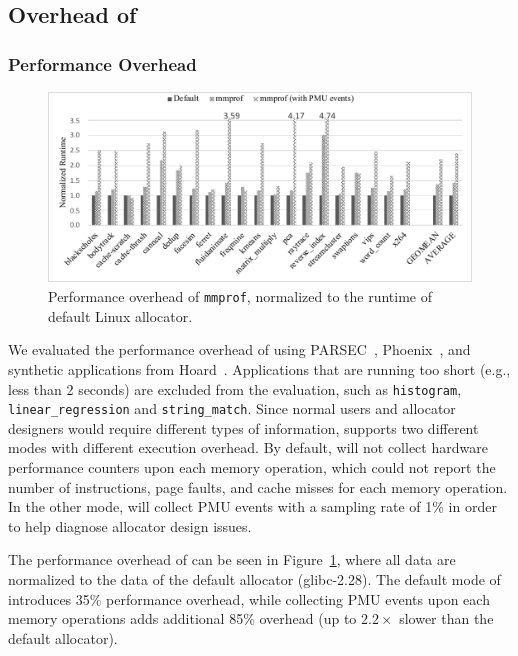 


\subsection{Overhead of \MP{}}

\subsubsection{Performance Overhead}
\label{sec:perf}

\begin{figure}[!ht]
\centering
\includegraphics[width=\columnwidth]{figures/mmprofPerformance}
\caption{Performance overhead of \texttt{mmprof}, normalized to the runtime of default Linux allocator.\label{fig:overhead}}
\end{figure}

We evaluated the performance overhead of 
\MP{} using PARSEC~\cite{parsec},  Phoenix~\cite{phoenix}, and synthetic applications from Hoard~\cite{Hoard}. Applications that are running too short (e.g., less than 2 seconds) are excluded from the evaluation, such as \texttt{histogram}, \texttt{linear\_regression} and \texttt{string\_match}. 
Since normal users and allocator designers would require different types of information, \MP{} supports two different modes with different execution overhead. By default, \MP{} will not collect hardware performance counters upon each memory operation, which could not report the number of instructions, page faults, and cache misses for each memory operation. In the other mode, \MP{} will collect PMU events with a sampling rate of 1\% in order to help diagnose allocator design issues. 

The performance overhead of \MP{} can be seen in Figure~\ref{fig:overhead}, where all data are normalized to the data of the default allocator (glibc-2.28). The default mode of \MP{} introduces 35\% performance overhead, while collecting PMU events upon each memory operations adds additional 85\%  overhead (up to $2.2\times$ slower than  the default allocator). 

